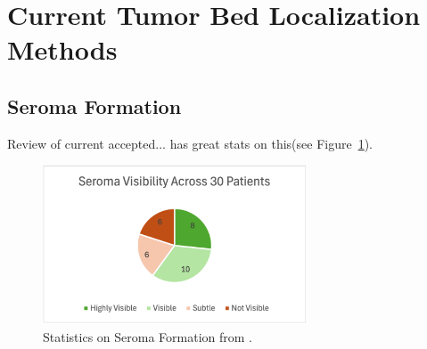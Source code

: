 \section{Current Tumor Bed Localization Methods\label{sec:literatureReview:currentMethods}}

\subsection{Seroma Formation\label{sec:literatureReview:seromaFormation}}
Review of current accepted...\cite{RefWorks:RefID:25-acree2022review} has great stats on this(see Figure~\ref{fig:literatureReview:seromaFormationStats}).
\begin{figure}[h]
        \centering
        \includegraphics[width=0.7\textwidth]{../figs/literature_review/seroma_visibility_study_results.png}
        \caption{Statistics on Seroma Formation from \cite{RefWorks:RefID:25-acree2022review}.}
        \label{fig:literatureReview:seromaFormationStats}
\end{figure}

